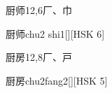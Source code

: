 \begin{Entry}{厨师}{12,6}{⼚、⼱}
  \begin{Phonetics}{厨师}{chu2 shi1}[][HSK 6]
  \end{Phonetics}
\end{Entry}

\begin{Entry}{厨房}{12,8}{⼚、⼾}
  \begin{Phonetics}{厨房}{chu2fang2}[][HSK 5]
  \end{Phonetics}
\end{Entry}


